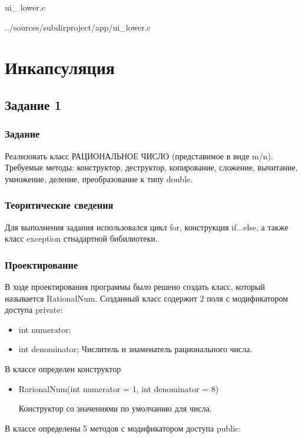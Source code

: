 \documentclass[12pt,a4paper]{report}
\begin{document}
\vspace{\baselineskip}

ui\_ lower.c

{../sources/subdirproject/app/ui_lower.c}


\chapter{Инкапсуляция}
\section{Задание 1}
\subsection{Задание}

Реализовать класс РАЦИОНАЛЬНОЕ ЧИСЛО (представимое в виде m/n). Требуемые методы: конструктор, деструктор, копирование, сложение, вычитание, умножение, деление, преобразование к типу double.

\subsection{Теоритические сведения}

Для выполнения задания использовался цикл for, конструкция if...else, а также класс exception стнадартной бибилиотеки.

\subsection{Проектирование}


В ходе проектирования программы было решено создать класс, который называется RationalNum.
Созданный класс содержит 2 поля с модификатором доступа private:

\begin{itemize}
	\item  int numerator;
    \item  int denominator;
    Числитель и знаменатель рационального числа.
\end{itemize}
	
	В классе определен конструктор 
\begin{itemize}

	\item RarionalNum(int numerator = 1, int denominator = 8)
	
	Конструктор со значениями по умолчанию для числа. 
	
			
\end{itemize}	
В классе определены 5 методов с модификатором доступа public:		
\end{document}
